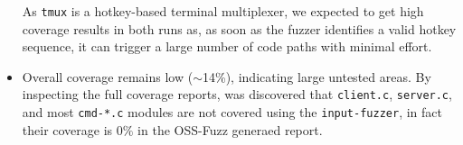 \begin{itemize}
	      As \texttt{tmux} is a hotkey-based terminal multiplexer, we expected to get high coverage results in both runs as, as soon as the fuzzer identifies a valid hotkey sequence, it can trigger a large number of code paths with minimal effort.

	\item Overall coverage remains low ($\sim$14\%), indicating large untested areas. By inspecting the full coverage reports, was discovered that \texttt{client.c}, \texttt{server.c}, and most \texttt{cmd-*.c} modules are not covered using the \texttt{input-fuzzer}, in fact their coverage is $0\%$ in the OSS-Fuzz generaed report.
\end{itemize}
